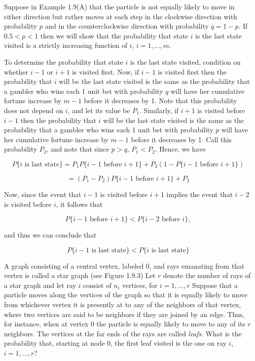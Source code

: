 \documentclass[lang=cn,10pt]{elegantbook}
\begin{document}
\begin{example}
	Suppose in Example 1.9(A) that the particle is not equally likely to move in either direction but rather moves at each step in the clockwise direction with probability $p$ and in the counterclockwise direction with probability $q = 1 - p$. If $0.5 < p < 1$ then we will show that the probability that state $i$ is the last state visited is a strictly increasing function of $i$, $i = 1, \ldots, m$.

To determine the probability that state $i$ is the last state visited, condition on whether $i - 1$ or $i + 1$ is visited first. Now, if $i - 1$ is visited first then the probability that $i$ will be the last state visited is the same as the probability that a gambler who wins each 1 unit bet with probability $q$ will have her cumulative fortune increase by $m - 1$ before it decreases by 1. Note that this probability does not depend on $i$, and let its value be $P_1$. Similarly, if $i + 1$ is visited before $i - 1$ then the probability that $i$ will be the last state visited is the same as the probability that a gambler who wins each 1 unit bet with probability $p$ will have her cumulative fortune increase by $m - 1$ before it decreases by 1. Call this probability $P_2$, and note that since $p > q$, $P_1 < P_2$. Hence, we have

\[
P\{i \text{ is last state}\} = P_1 P\{i - 1 \text{ before } i + 1\} + P_2 (1 - P\{i - 1 \text{ before } i + 1\})
\]

\[
= (P_1 - P_2) P\{i - 1 \text{ before } i + 1\} + P_2
\]

Now, since the event that $i - 1$ is visited before $i + 1$ implies the event that $i - 2$ is visited before $i$, it follows that

\[
P\{i - 1 \text{ before } i + 1\} < P\{i - 2 \text{ before } i\},
\]

and thus we can conclude that

\[
P\{i - 1 \text{ is last state}\} < P\{i \text{ is last state}\}
\]
\end{example}
\begin{example}
	\quad A graph consisting of a central vertex, labeled 0, and rays emanating from that vertex is called a star graph (see Figure 1.9.3) Let $r$ denote the number of rays of a star graph and let ray $i$ consist of $n_i$ vertices, for $i = 1, \ldots, r$ Suppose that a particle moves along the vertices of the graph so that it is equally likely to move from whichever vertex it is presently at to any of the neighbors of that vertex, where two vertices are said to be neighbors if they are joined by an edge. Thus, for instance, when at vertex 0 the particle is equally likely to move to any of its $r$ neighbors. The vertices at the far ends of the rays are called \textit{leafs}. What is the probability that, starting at node 0, the first leaf visited is the one on ray $i$, $i = 1, \ldots, r$?
\end{example}
\end{document}
